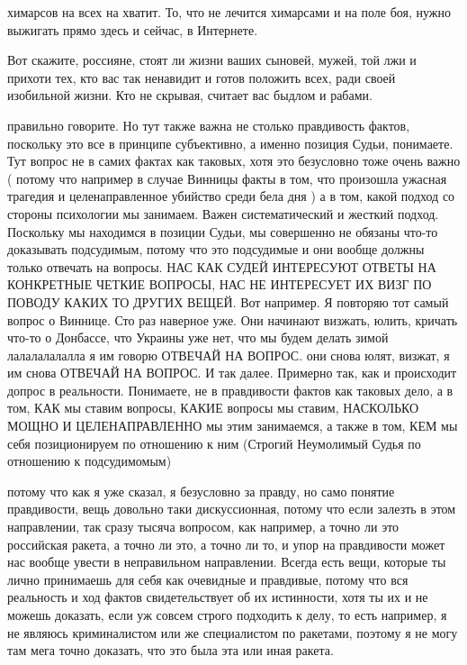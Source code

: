 химарсов на всех на хватит. То, что не лечится химарсами и на поле боя, нужно
выжигать прямо здесь и сейчас, в Интернете.

Вот скажите, россияне, стоят ли жизни ваших сыновей, мужей, той лжи и прихоти
тех, кто вас так ненавидит и готов положить всех, ради своей изобильной жизни.
Кто не скрывая, считает вас быдлом и рабами.

правильно говорите. Но тут также важна не столько правдивость фактов, поскольку
это все в принципе субъективно, а именно позиция Судьи, понимаете. Тут вопрос
не в самих фактах как таковых, хотя это безусловно тоже очень важно ( потому
что например в случае Винницы факты в том, что произошла ужасная трагедия и
целенаправленное убийство среди бела дня ) а в том, какой подход со стороны
психологии мы занимаем. Важен систематический и жесткий подход. Поскольку мы
находимся в позиции Судьи, мы совершенно не обязаны что-то доказывать
подсудимым, потому что это подсудимые и они вообще должны только отвечать на
вопросы. НАС КАК СУДЕЙ ИНТЕРЕСУЮТ ОТВЕТЫ НА КОНКРЕТНЫЕ ЧЕТКИЕ ВОПРОСЫ, НАС НЕ
ИНТЕРЕСУЕТ ИХ ВИЗГ ПО ПОВОДУ КАКИХ ТО ДРУГИХ ВЕЩЕЙ. Вот например. Я повторяю
тот самый вопрос о Виннице. Сто раз наверное уже. Они начинают визжать, юлить,
кричать что-то о Донбассе, что Украины уже нет, что мы будем делать зимой
лалалалалалла я им говорю ОТВЕЧАЙ НА ВОПРОС. они снова юлят, визжат, я им снова
ОТВЕЧАЙ НА ВОПРОС. И так далее. Примерно так, как и происходит допрос в
реальности. Понимаете, не в правдивости фактов как таковых дело, а в том, КАК
мы ставим вопросы, КАКИЕ вопросы мы ставим, НАСКОЛЬКО МОЩНО И ЦЕЛЕНАПРАВЛЕННО
мы этим занимаемся, а также в том, КЕМ мы себя позиционируем по отношению к ним
(Строгий Неумолимый Судья по отношению к подсудимомым)

потому что как я уже сказал, я безусловно за правду, но само понятие
правдивости, вещь довольно таки дискуссионная, потому что если залезть в этом
направлении, так сразу тысяча вопросом, как например, а точно ли это российская
ракета, а точно ли это, а точно ли то, и упор на правдивости может нас вообще
увести в неправильном направлении. Всегда есть вещи, которые ты лично
принимаешь для себя как очевидные и правдивые, потому что вся реальность и ход
фактов свидетельствует об их истинности, хотя ты их и не можешь доказать, если
уж совсем строго подходить к делу, то есть например, я не являюсь криминалистом
или же специалистом по ракетами, поэтому я не могу там мега точно доказать, что
это была эта или иная ракета.
